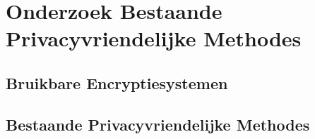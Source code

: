 \chapter{Onderzoek Bestaande Privacyvriendelijke Methodes}
\label{onderzoek}

\section{Bruikbare Encryptiesystemen}



\section{Bestaande Privacyvriendelijke Methodes}










